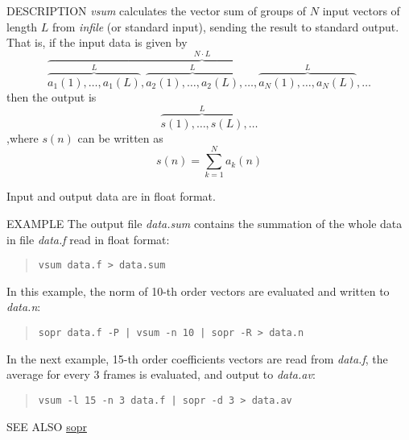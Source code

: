 \begin{synopsis}
\item[vsum] [ --l $L$ ] [ --n $N$ ] [ {\em infile} ]
\end{synopsis}

\begin{qsection}{DESCRIPTION}
{\em vsum} calculates the vector sum of groups of $N$ input vectors 
of length $L$ from {\em infile} (or standard input), 
sending the result to standard output.
That is, if the input data is given by
\begin{displaymath}
\overbrace{
  \overbrace{a_1(1),\dots,a_1(L)}^{L},
  \overbrace{a_2(1),\dots,a_2(L)}^{L},\dots,
  \overbrace{a_N(1),\dots,a_N(L)}^{L}
}^{N \cdot L},\dots
\end{displaymath}
then the output is 
\begin{displaymath}
  \overbrace{s(1),\dots,s(L)}^{L},\dots
\end{displaymath}
,where $s(n)$ can be written as
\begin{displaymath}
  s(n)=\sum_{k=1}^{N} a_k(n)
\end{displaymath}

Input and output data are in float format.
\end{qsection}

\begin{options}
\end{options}

\begin{qsection}{EXAMPLE}
The output file {\em data.sum} contains the summation of
the whole data in file {\em data.f} read in float format:
\begin{quote}
  \verb!vsum data.f > data.sum!
\end{quote}
\par
In this example, the norm of 10-th order vectors are
evaluated and written to {\em data.n}:
\begin{quote}
  \verb!sopr data.f -P | vsum -n 10 | sopr -R > data.n!
\end{quote}
\par
In the next example, 15-th order coefficients vectors are read
from {\em data.f}, the average for every 3 frames is evaluated,
and output to {\em data.av}:
\begin{quote}
  \verb!vsum -l 15 -n 3 data.f | sopr -d 3 > data.av!
\end{quote}
\end{qsection}

\begin{qsection}{SEE ALSO}
\hyperlink{sopr}{sopr}
\end{qsection}
